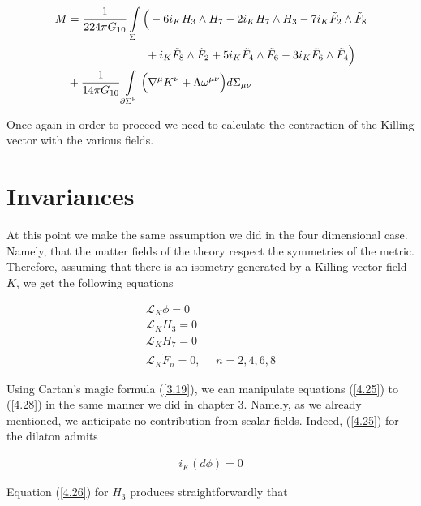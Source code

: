 \documentclass[a4paper,notitlepage]{report}
\begin{document}
\begin{align} \label{4.24}
M &= \frac{1}{224 \pi G_{10}} \int\limits_{\Sigma} \Big( -6 i_K H_3 \wedge H_7 - 2 i_K H_7 \wedge H_3 - 7 i_K \tilde{F}_2 \wedge \tilde{F}_8  \\ \notag
& \:\:\:\:\:\:\:\:\:\:\:\:\:\:\:\:\:\:\:\:\:\:\:\:\:\:\:\:\:\:\: + i_K \tilde{F}_8 \wedge \tilde{F}_2 + 5 i_K \tilde{F}_4 \wedge \tilde{F}_6 - 3 i_K \tilde{F}_6 \wedge \tilde{F}_4 \Big) \\ \notag
&+ \frac{1}{14\pi G_{10}}  \int\limits_{\partial \Sigma^{\text{h}}} \Big( \nabla^{\mu} K^{\nu} + \Lambda \omega^{\mu\nu} \Big) d\Sigma_{\mu\nu}
\end{align}

\vspace{0.5em}
Once again in order to proceed we need to calculate the contraction of the Killing vector with the various fields.

\section{Invariances}

At this point we make the same assumption we did in the four dimensional case. Namely, that the matter fields of the theory respect the symmetries of the metric. Therefore, assuming that there is an isometry generated by a Killing vector field $K$, we get the following equations

\begin{gather}
\mathcal{L}_{K} \phi = 0 \label{4.25} \\
\mathcal{L}_{K} H_{3} = 0 \label{4.26} \\ 
\mathcal{L}_{K} H_{7} = 0 \label{4.27} \\
\mathcal{L}_{K} \tilde{F}_{n} = 0, \:\:\:\:\:\:  n=2,4,6,8 \label{4.28}
\end{gather}

\vspace{0.5em}
Using Cartan's magic formula (\ref{3.19}), we can manipulate equations (\ref{4.25}) to (\ref{4.28}) in the same manner we did in chapter 3. Namely, as we already mentioned, we anticipate no contribution from scalar fields. Indeed, (\ref{4.25}) for the dilaton admits

\begin{align} \label{4.29}
i_{K} (d \phi) = 0
\end{align}

\vspace{0.5em}
Equation (\ref{4.26}) for $H_{3}$ produces straightforwardly that
\end{document}
